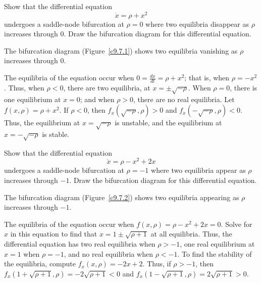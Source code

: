 \documentclass{ximera}
\begin{document}
\begin{exercise} \label{c9.7.1}
Show that the differential equation 
\[
\dot{x} = \rho + x^2
\]
undergoes a saddle-node bifurcation at $\rho=0$ where two equilibria 
disappear as $\rho$ increases through $0$.  Draw the bifurcation diagram 
for this differential equation.

\begin{solution}

\ans The bifurcation diagram (Figure~\ref{c9.7.1}) shows two equilibria
vanishing as $\rho$ increases through $0$.

\soln The equilibria of the equation occur when $0 = \frac{dx}{dt} =
\rho + x^2$; that is, when $\rho = -x^2$.  Thus, when $\rho < 0$, there
are two equilibria, at $x = \pm\sqrt{-\rho}$.  When $\rho = 0$, there is
one equilibrium at $x = 0$; and when $\rho > 0$, there are no real
equilibria.  Let $f(x,\rho) = \rho + x^2$.  If $\rho < 0$, 
then $f_x(\sqrt{-\rho},\rho) > 0$ and $f_x(-\sqrt{-\rho},\rho) < 0$. 
Thus, the equilibrium at $x = \sqrt{-\rho}$ is unstable, and the
equilibrium at $x = -\sqrt{-\rho}$ is stable.

\begin{figure}[htb]
                       \centerline{%
                       }
\end{figure}

\end{solution}
\end{exercise}

\begin{exercise} \label{c9.7.2}
Show that the differential equation
\[
\dot{x} = \rho - x^2 + 2x
\]
undergoes a saddle-node bifurcation at $\rho=-1$ where two equilibria
appear as $\rho$ increases through $-1$.  Draw the bifurcation diagram
for this differential equation.

\begin{solution}

\ans The bifurcation diagram (Figure~\ref{c9.7.2}) shows two equilibria
appearing as $\rho$ increases through $-1$.

\soln The equilibria of the equation occur when $f(x,\rho) = \rho - x^2 +
2x = 0$.  Solve for $x$ in this equation to find that $x = 1 \pm
\sqrt{\rho + 1}$ at all equilibria.  Thus, the differential equation has
two real equilibria when $\rho > -1$, one real equilibrium at $x = 1$ when
$\rho = -1$, and no real equilibria when $\rho < -1$.  To find the
stability of the equilibria, compute $f_x(x,\rho) = -2x + 2$.  Thus, if
$\rho > -1$, then
$f_x(1 + \sqrt{\rho + 1},\rho) = -2\sqrt{\rho + 1} < 0$ and
$f_x(1 - \sqrt{\rho + 1},\rho) = 2\sqrt{\rho + 1} > 0$.

\begin{figure}[htb]
                       \centerline{%
                       }
\end{figure}

\end{solution}
\end{exercise}
\end{document}
